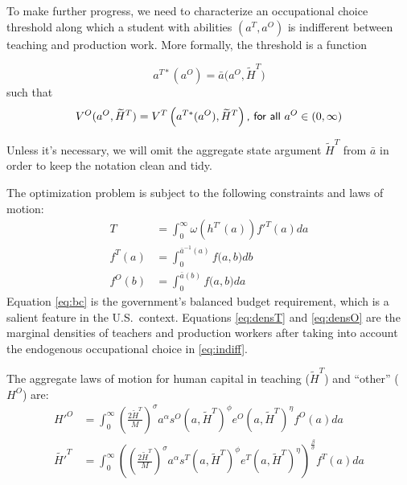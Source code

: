 \documentclass[onehalfspacing,11pt]{article}
\begin{document}
To make further progress, we need to characterize an occupational choice threshold along which a student with abilities $(a^T,a^O)$ is indifferent between teaching and production work. More formally, the threshold is a function

\begin{equation*}
a^{T*}(a^O) = \bar{a}\big(a^{O},\widetilde{H}^T\big) %
\end{equation*}
such that
\begin{equation}
\label{eq:indiff}
V^{O}(a^{O},\widetilde{H}^T) = V^{T}\left(a^{T*}(a^O),\widetilde{H}^T\right) \textrm{{\sf , for all} } a^O \in (0,\infty)
\end{equation}

Unless it's necessary, we will omit the aggregate state argument $\widetilde{H}^T$ from $\bar{a}$ in order to keep the notation clean and tidy.

The optimization problem is subject to the following constraints and laws of motion:
\begin{align}
\label{eq:bc}
T & = \int_0^\infty \omega\left(h^{T'}(a)\right) {f'}^T(a) da \\%
\label{eq:densT}
f^T(a) & = \int_0^{\bar{a}^{-1}\left(a\right)} f\big(a,b \big) db \\
\label{eq:densO}
f^O(b) & = \int_0^{\bar{a}\left(b\right)} f\big(a,b \big) da 
\end{align}
Equation \eqref{eq:bc} is the government's balanced budget requirement, which is a salient feature in the U.S.~context. Equations \eqref{eq:densT} and \eqref{eq:densO} are the marginal densities of teachers and production workers after taking into account the endogenous occupational choice in \eqref{eq:indiff}.

The aggregate laws of motion for human capital in teaching ($\widetilde{H}^T$) and ``other'' (${H}^O$) are:
\begin{align}
\label{eq:lomO}
{H'}^{O} & = \int_0^\infty \left(\tfrac{2 \widetilde{H}^T}{M}\right)^\sigma a^\alpha s^O\left(a,\widetilde{H}^T\right)^\phi e^O(a,\widetilde{H}^T)^\eta  f^O(a) da \\
\label{eq:lomT}
\widetilde{H'}^{T} & = \int_0^\infty \left(\left(\tfrac{2 \widetilde{H}^T}{M}\right)^\sigma a^\alpha s^T\left(a,\widetilde{H}^T\right)^\phi e^T(a,\widetilde{H}^T)^\eta \right)^{\frac{\beta}{\sigma}} f^T(a) da 
\end{align}
\end{document}
